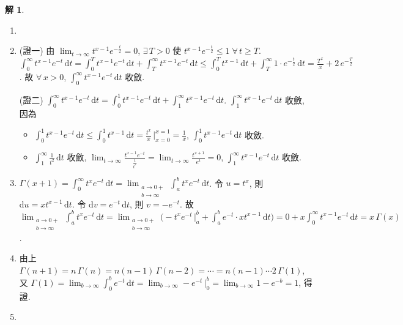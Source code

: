 \documentclass[12pt]{extarticle}
\newcommand{\ds}{\displaystyle}
\theoremstyle{definition}
\newtheorem*{sol}{解}
\begin{document}
\begin{sol}
  \begin{enumerate}\setlength{\itemsep}{0pt}
    \item[]
    \item (證一)  由 $\ds\lim_{t\to\infty}t^{x-1}e^{-\frac{t}{2}} = 0$, $\ds\exists\,T > 0$ 使 $\ds t^{x-1}e^{-\frac{t}{2}}\leqslant 1\;\forall\,t\geqslant T$. $\ds\int_0^\infty\!t^{x-1}e^{-t}\,\text{d}t = \int_0^T\!t^{x-1}e^{-t}\,\text{d}t + \int_T^\infty\!t^{x-1}e^{-t}\,\text{d}t\leqslant\int_0^T\!t^{x - 1}\,\text{d}t + \int_T^\infty 1\cdot e^{-\frac{t}{2}}\,\text{d}t = \frac{T^x}{x} + 2\,e^{-\frac{T}{2}}$. 故 $\forall\,x > 0$, $\ds\int_0^\infty\!t^{x-1}e^{-t}\,\text{d}t$ 收斂. 

      (證二) $\ds\int_0^\infty\!t^{x-1}e^{-t}\,\text{d}t = \int_0^1\!t^{x - 1}e^{-t}\,\text{d}t + \int_1^\infty\!t^{x - 1}e^{-t}\,\text{d}t$. $\ds\int_1^\infty\!t^{x - 1}e^{-t}\,\text{d}t$ 收斂, 因為  
      \begin{itemize}\setlength{\itemsep}{0pt}
        \item $\ds\int_0^1\!t^{x - 1}e^{-t}\,\text{d}t\leqslant\int_0^1\!t^{x - 1}\,\text{d}t = \frac{t^x}{x}\,\bigg|_{x = 0}^{x = 1} = \frac{1}{x}$, $\ds\int_0^1\!t^{x - 1}e^{-t}\,\text{d}t$ 收斂. 
        \item $\ds\int_1^\infty\!\frac{1}{t^2}\,\text{d}t$ 收斂, $\ds\lim_{t\to\infty}\frac{t^{x - 1}e^{-t}}{\frac{1}{t^2}} = \lim_{t\to\infty}\frac{t^{x + 1}}{e^t} = 0$, $\ds\int_1^\infty\!t^{x - 1}e^{-t}\,\text{d}t$ 收斂. 
      \end{itemize}
    \item $\ds\Gamma(x + 1) = \int_0^\infty\!t^x e^{-t}\,\text{d}t = \lim_{\substack{a\to0+ \\ b\to\infty}}\int_a^b\!t^{x}e^{-t}\,\text{d}t$. 令 $\ds u = t^x$, 則 $\ds\text{d}u = xt^{x-1}\,\text{d}t$. 令 $\ds\text{d}v = e^{-t}\,\text{d}t$, 則 $\ds v = -e^{-t}$. 故 $\ds\lim_{\substack{a\to0+\\b\to\infty}}\int_a^b\!t^{x}e^{-t}\,\text{d}t = \lim_{\substack{a\to0+\\b\to\infty}}\Big(-t^x e^{-t}\,\Big|_a^b + \int_a^b\!e^{-t}\cdot xt^{x-1}\,\text{d}t\Big) = 0 + x\int_0^\infty\!t^{x-1}e^{-t}\,\text{d}t =x\,\Gamma(x)$. 
    \item 由上 $\ds\Gamma(n + 1) = n\,\Gamma(n) = n(n - 1)\,\Gamma(n - 2) = \cdots = n(n - 1)\cdots 2\,\Gamma(1)$, 又 $\ds\Gamma(1) = \lim_{b\to\infty}\int_0^b\!e^{-t}\,\text{d}t = \lim_{b\to\infty}-e^{-t}\,\Big|_0^b = \lim_{b\to\infty} 1 - e^{-b} = 1$, 得證. 
    \item 

\end{enumerate}
\end{sol}
\end{document}
